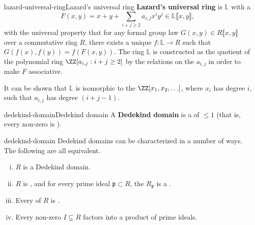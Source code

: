 \begin{topic}{lazard-universal-ring}{Lazard's universal ring}
    \textbf{Lazard's universal ring} is  $\mathbb{L}$ with a 
    \[ F(x, y) = x + y + \sum_{i + j \ge 2} a_{i,j} x^i y^j \in \mathbb{L}\llbracket x, y \rrbracket , \]
    with the universal property that for any formal group law $G(x, y) \in R \llbracket x, y \rrbracket$ over a commutative ring $R$, there exists a unique  $f : \mathbb{L} \to R$ such that $G(f(x), f(y)) = f(F(x, y))$. The ring $\mathbb{L}$ is constructed as the quotient of the polynomial ring $\ZZ[a_{i, j} : i + j \ge 2]$ by the relations on the $a_{i, j}$ in order to make $F$ associative.
    
    It can be shown that $\mathbb{L}$ is isomorphic to the  $\ZZ[x_1, x_2, \ldots]$, where $x_i$ has degree $i$, such that $a_{i, j}$ has degree $(i + j - 1)$.
\end{topic}

\begin{topic}{dedekind-domain}{Dedekind domain}
    A \textbf{Dedekind domain} is a   of  $\le 1$ (that is, every non-zero  is ).
\end{topic}

\begin{example}{dedekind-domain}
    Dedekind domains can be characterized in a number of ways. The following are all equivalent.
    \begin{enumerate}[(i)]
        \item $R$ is a Dedekind domain.
        \item $R$ is , and for every prime ideal $\mathfrak{p} \subset R$, the  $R_\mathfrak{p}$ is a .
        \item Every  of $R$ is .
        \item Every non-zero  $I \subsetneq R$ factors into a product of prime ideals.
    \end{enumerate}
\end{example}

